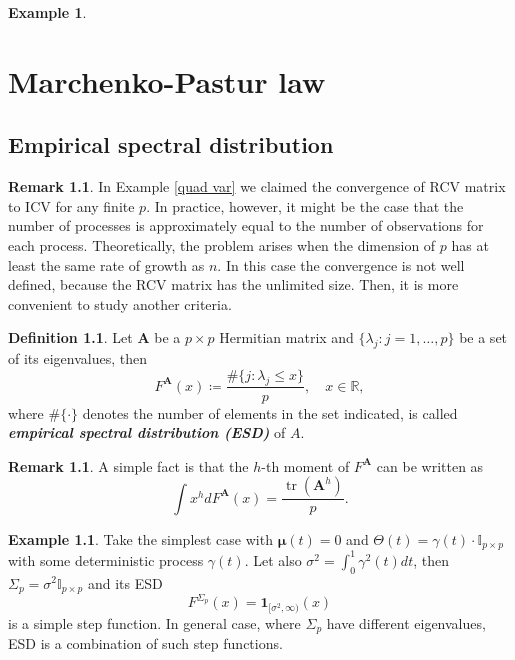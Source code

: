 \documentclass[a4paper,11pt]{book}
\theoremstyle{plain}
\theoremstyle{definition}
\newtheorem{defn}[thm]{Definition}
\newtheorem{exmp}[thm]{Example}
\newtheorem{rmrk}[thm]{Remark}
\newcommand{\MR}{\mathbb{R}}
\newcommand{\tr}{\operatorname{tr}}
\newcommand{\define}[1]{\textit{\textbf{#1}}}
\begin{document}
\begin{exmp}
	\end{exmp}
	
	\chapter{Marchenko-Pastur law}
	\section{Empirical spectral distribution}
	\begin{rmrk}
		In Example \ref{quad var} we claimed the convergence of RCV matrix to ICV for any finite $p$. In practice, however, it might be the case that the number of processes is approximately equal to the number of observations for each process. Theoretically, the problem arises when the dimension of $p$ has at least the same rate of growth as $n$. In this case the convergence is not well defined, because the RCV matrix has the unlimited size. Then, it is more convenient to study another criteria.
	\end{rmrk}
	
	\begin{defn}
		Let $\mathbf{A}$ be a $p \times p$ Hermitian matrix and $\{\lambda_j:j=1,\dots, p\}$ be a set of its eigenvalues, then
		\[F^{\mathbf{A}}(x) \coloneqq \frac{\#\{j:\lambda_j \leq x\}}{p}, \quad x \in \MR, \]
		where $\#\{ \cdot \}$ denotes the number of elements in the set indicated, is called \define{empirical spectral distribution (ESD)} of $A$.
	\end{defn}
	
	\begin{rmrk}
		A simple fact is that the $h$-th moment of $F^{\mathbf{A}}$ can be written as
		\[ \int x^h dF^{\mathbf{A}}(x) = \frac{\tr(\mathbf{A}^h)}{p}. \]
	\end{rmrk}
	
	\begin{exmp} \label{ESD finite p}
		Take the simplest case with $\boldsymbol{\mu}(t) = 0$ and $\Theta(t) = \gamma(t) \cdot \mathbb{I}_{p \times p}$ with some deterministic process $\gamma(t)$. Let also $\sigma^2 = \int_{0}^{1} \gamma^2(t) dt$, then $\Sigma_p = \sigma^2 \mathbb{I}_{p \times p}$ and its ESD
		\[ F^{\Sigma_p}(x) = \mathbf{1}_{[\sigma^2, \infty)}(x) \]
		is a simple step function. In general case, where $\Sigma_p$ have different eigenvalues, ESD is a combination of such step functions.
	\end{exmp}
	
\end{document}
